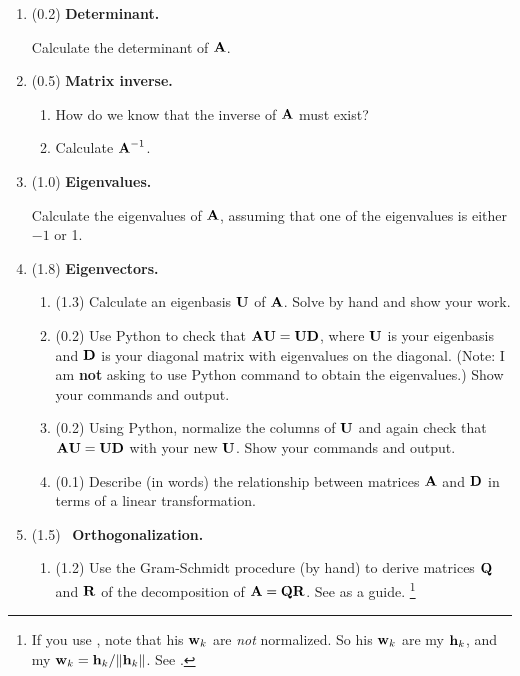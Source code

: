 \begin{enumerate}
\item (0.2) {\bf Determinant.}

Calculate the determinant of $\mbox{${\bf A}$}$.

\item (0.5) {\bf Matrix inverse.}

\begin{enumerate}
\item How do we know that the inverse of $\mbox{${\bf A}$}$ must exist?
\item Calculate $\mbox{${\bf A}$}^{-1}$.
\end{enumerate}

\item (1.0) {\bf Eigenvalues.}

Calculate the eigenvalues of $\mbox{${\bf A}$}$, assuming that one of the eigenvalues is either $-1$ or 1.

\item (1.8) {\bf Eigenvectors.}

\begin{enumerate}
\item (1.3) Calculate an eigenbasis $\mbox{${\bf U}$}$ of $\mbox{${\bf A}$}$. Solve by hand and show your work.

\item (0.2) Use Python to check that $\mbox{${\bf A}$}\mbox{${\bf U}$} = \mbox{${\bf U}$}\mbox{${\bf D}$}$, where $\mbox{${\bf U}$}$ is your eigenbasis and $\mbox{${\bf D}$}$ is your diagonal matrix with eigenvalues on the diagonal. (Note: I am {\bf not} asking to use Python command to obtain the eigenvalues.) Show your commands and output.

\item (0.2) Using Python, normalize the columns of $\mbox{${\bf U}$}$ and again check that $\mbox{${\bf A}$}\mbox{${\bf U}$} = \mbox{${\bf U}$}\mbox{${\bf D}$}$ with your new $\mbox{${\bf U}$}$. Show your commands and output.

\item (0.1) Describe (in words) the relationship between matrices $\mbox{${\bf A}$}$ and $\mbox{${\bf D}$}$ in terms of a linear transformation.

\end{enumerate}

\item (1.5) \ptag\ {\bf Orthogonalization.}

\begin{enumerate}
\item (1.2) Use the Gram-Schmidt procedure (by hand) to derive matrices $\mbox{${\bf Q}$}$ and $\mbox{${\bf R}$}$ of the decomposition of $\mbox{${\bf A}$} = \mbox{${\bf Q}$}\mbox{${\bf R}$}$. See  as a guide.
\footnote{If you use \citet[][p.~326]{Aster}, note that his $\mbox{${\bf w}$}_k$ are {\em not} normalized. So his $\mbox{${\bf w}$}_k$ are my $\mbox{${\bf h}$}_k$, and my $\mbox{${\bf w}$}_k = \mbox{${\bf h}$}_k/\|\mbox{${\bf h}$}_k\|$. See .}


\end{enumerate}
\end{enumerate}
